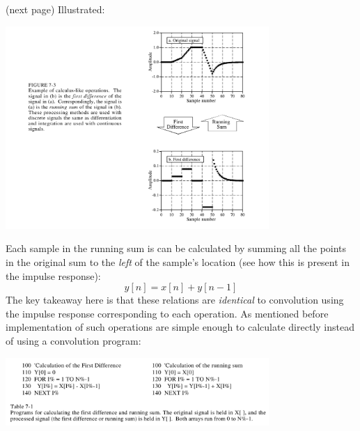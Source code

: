 \documentclass{report}
\begin{document}
(next page)\newpage
\noindent Illustrated:
\begin{center}
\includegraphics[width=10cm]{a11}\\
\end{center}
Each sample in the running sum is can be calculated by summing all the points in the original sum to the 
\textit{left} of the sample's location (see how this is present in the impulse response):
\begin{equation*}
y[n]=x[n]+y[n-1]
\end{equation*}
The key takeaway here is that these relations are \textit{identical} to convolution using the impulse response 
corresponding to each operation. As mentioned before 
implementation of such operations are simple enough to calculate directly instead of using a convolution program:
\begin{center}
\includegraphics[width=10cm]{a12}\\
\end{center}
\newpage
\end{document}
